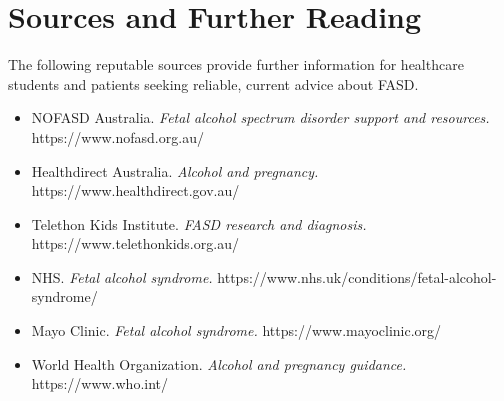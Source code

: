 \section*{Sources and Further Reading}
The following reputable sources provide further information for healthcare students and patients seeking reliable, current advice about FASD.
\begin{itemize}
    \item NOFASD Australia. \textit{Fetal alcohol spectrum disorder support and resources.} https://www.nofasd.org.au/
    \item Healthdirect Australia. \textit{Alcohol and pregnancy.} https://www.healthdirect.gov.au/
    \item Telethon Kids Institute. \textit{FASD research and diagnosis.} https://www.telethonkids.org.au/
    \item NHS. \textit{Fetal alcohol syndrome.} https://www.nhs.uk/conditions/fetal-alcohol-syndrome/
    \item Mayo Clinic. \textit{Fetal alcohol syndrome.} https://www.mayoclinic.org/
    \item World Health Organization. \textit{Alcohol and pregnancy guidance.} https://www.who.int/
\end{itemize}
